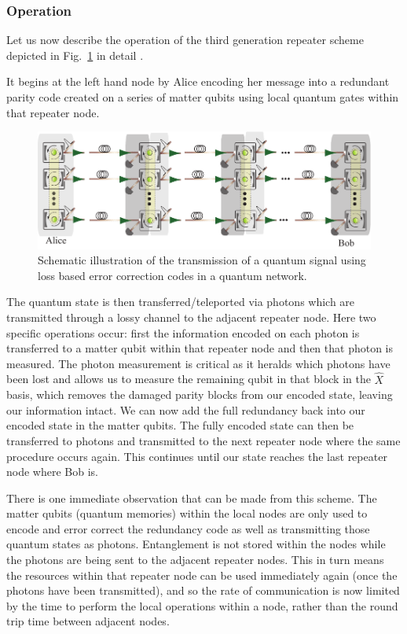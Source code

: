 \documentclass[twocolumn, aps, rmp, amsmath, amssymb, nofootinbib, superscriptaddress, longbibliography, floatfix, table-of-contents, eqsecnum]{revtex4-1}
\newcommand{\comment}[1]{{\color{blue}{\textbf{#1}}}}
\begin{document}
\subsubsection{Operation}

Let us now describe the operation of the third generation repeater scheme  depicted in Fig.~\ref{fig:repeaters_9} in detail \cite{bib:munro12, bib:MKLLJ14}.

\comment{Up to here}

It begins at the left hand node by Alice encoding her message into a redundant parity code created on a series of matter qubits using local quantum gates within that repeater node.

\begin{figure}[!htb]
\includegraphics[width=\textwidth]{repeaters_9}
\caption{\comment{Redo fig}Schematic illustration of the transmission of a quantum signal using loss based error correction codes in a quantum network.}
\label{fig:repeaters_9}
\end{figure}

The quantum state is then transferred/teleported via photons which are transmitted through a lossy channel to the adjacent repeater node. Here two specific operations occur: first the information encoded on each photon is transferred to a matter qubit within that repeater node and then that photon is measured. The photon measurement is critical as it heralds which photons have been lost and allows us to measure the remaining qubit in that block in the $\hat{X}$ basis, which removes the damaged parity blocks from our encoded state, leaving our information intact. We can now add the full redundancy back into our encoded state in the matter qubits. The fully encoded state can then be transferred to photons and transmitted to the next repeater node where the same procedure occurs again. This continues until our state reaches the last repeater node where Bob is.

There is one immediate observation that can be made from this scheme. The matter qubits (quantum memories) within the local nodes are only used to encode and error correct the redundancy code as well as transmitting those quantum states as photons. Entanglement is not stored within the nodes while the photons are being sent to the adjacent repeater nodes. This in turn means the resources within that repeater node can be used immediately again (once the photons have been transmitted), and so the rate of communication is now limited by the time to perform the local operations within a node, rather than the round trip time between adjacent nodes. 
\end{document}
